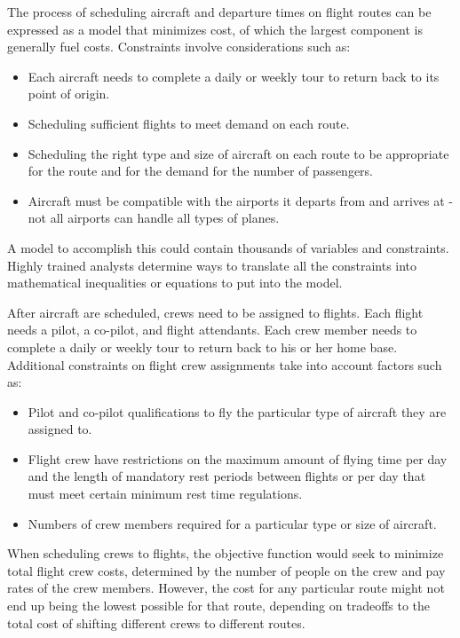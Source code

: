 The process of scheduling aircraft and departure times on flight routes can be expressed as a model that minimizes cost, of which the largest component is generally fuel costs. Constraints involve considerations such as:
\begin{itemize}
    \item Each aircraft needs to complete a daily or weekly tour to return back to its point of origin.
    \item Scheduling sufficient flights to meet demand on each route.
    \item Scheduling the right type and size of aircraft on each route to be appropriate for the route and for the demand for the number of passengers.
    \item Aircraft must be compatible with the airports it departs from and arrives at - not all airports can handle all types of planes.
\end{itemize}

A model to accomplish this could contain thousands of variables and constraints. Highly trained analysts determine ways to translate all the constraints into mathematical inequalities or equations to put into the model.

After aircraft are scheduled, crews need to be assigned to flights. Each flight needs a pilot, a co-pilot, and flight attendants. Each crew member needs to complete a daily or weekly tour to return back to his or her home base. Additional constraints on flight crew assignments take into account factors such as:
\begin{itemize}
    \item Pilot and co-pilot qualifications to fly the particular type of aircraft they are assigned to.
    \item Flight crew have restrictions on the maximum amount of flying time per day and the length of mandatory rest periods between flights or per day that must meet certain minimum rest time regulations.
    \item Numbers of crew members required for a particular type or size of aircraft.
\end{itemize}

When scheduling crews to flights, the objective function would seek to minimize total flight crew costs, determined by the number of people on the crew and pay rates of the crew members. However, the cost for any particular route might not end up being the lowest possible for that route, depending on tradeoffs to the total cost of shifting different crews to different routes.

